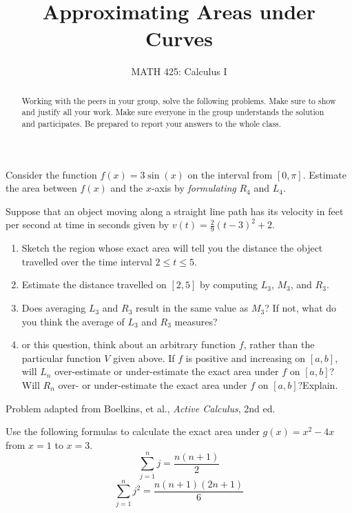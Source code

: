 \documentclass{ximera}
\title{Approximating Areas under Curves}
\author{MATH 425: Calculus I}
\begin{document}
\begin{abstract}
   Working with the peers in your group, solve the following problems. Make sure to show and justify all your work. Make sure everyone in the group understands the solution and participates. Be prepared to report your answers to the whole class. 
\end{abstract}
\maketitle


\begin{exercise}
    Consider the function $f(x)=3\sin(x)$ on the interval from $[0,\pi]$.  Estimate the area between $f(x)$ and the $x$-axis by \textit{formulating} $R_4$ and $L_4$.\\
\end{exercise}

\begin{exercise}
    Suppose that an object moving along a straight line path has its velocity in feet per second at time 
 in seconds given by $v(t)=\frac29(t-3)^2+2$.
 \begin{enumerate}
    \item Sketch the region whose exact area will tell you the distance the object travelled over the time interval $2\leq t\leq 5$.
    \item Estimate the distance travelled on $[2,5]$ by computing $L_3$, $M_3$, and $R_3$.
    \item Does averaging $L_3$ and $R_3$ result in the same value as $M_3$?  If not, what do you think the average of $L_3$ and $R_3$ measures?
    \item or this question, think about an arbitrary function $f$, rather than the particular function $V$ given above. If $f$ is positive and increasing on $[a,b]$, will $L_n$ over-estimate or under-estimate the exact area under $f$ on $[a,b]$?  Will  $R_n$ over- or under-estimate the exact area under $f$ on $[a,b]$?Explain.
 \end{enumerate}
 Problem adapted from Boelkins, et al., \textit{Active Calculus}, 2nd ed.
 

\end{exercise}

\begin{exercise}
    Use the following formulas to calculate the exact area under $g(x)=x^2-4x$ from $x=1$ to $x=3$.  $$\sum_{j=1}^{n} j=\frac{n(n+1)}{2}$$
    $$\sum_{j=1}^n j^2=\frac{n(n+1)(2n+1)}{6}$$
\end{exercise}   
\end{document}
